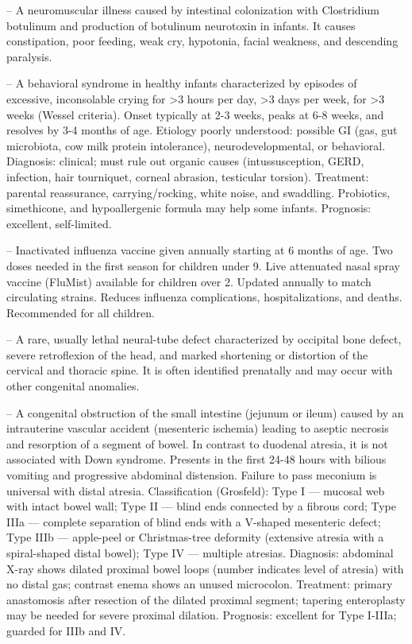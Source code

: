 -- A neuromuscular illness caused by intestinal colonization with Clostridium botulinum and production of botulinum neurotoxin in infants. It causes constipation, poor feeding, weak cry, hypotonia, facial weakness, and descending paralysis.

-- A behavioral syndrome in healthy infants characterized by episodes of excessive, inconsolable crying for >3 hours per day, >3 days per week, for >3 weeks (Wessel criteria). Onset typically at 2-3 weeks, peaks at 6-8 weeks, and resolves by 3-4 months of age. Etiology poorly understood: possible GI (gas, gut microbiota, cow milk protein intolerance), neurodevelopmental, or behavioral. Diagnosis: clinical; must rule out organic causes (intussusception, GERD, infection, hair tourniquet, corneal abrasion, testicular torsion). Treatment: parental reassurance, carrying/rocking, white noise, and swaddling. Probiotics, simethicone, and hypoallergenic formula may help some infants. Prognosis: excellent, self-limited.

-- Inactivated influenza vaccine given annually starting at 6 months of age. Two doses needed in the first season for children under 9. Live attenuated nasal spray vaccine (FluMist) available for children over 2. Updated annually to match circulating strains. Reduces influenza complications, hospitalizations, and deaths. Recommended for all children.

-- A rare, usually lethal neural-tube defect characterized by occipital bone defect, severe retroflexion of the head, and marked shortening or distortion of the cervical and thoracic spine. It is often identified prenatally and may occur with other congenital anomalies.

-- A congenital obstruction of the small intestine (jejunum or ileum) caused by an intrauterine vascular accident (mesenteric ischemia) leading to aseptic necrosis and resorption of a segment of bowel. In contrast to duodenal atresia, it is not associated with Down syndrome. Presents in the first 24-48 hours with bilious vomiting and progressive abdominal distension. Failure to pass meconium is universal with distal atresia. Classification (Grosfeld): Type I — mucosal web with intact bowel wall; Type II — blind ends connected by a fibrous cord; Type IIIa — complete separation of blind ends with a V-shaped mesenteric defect; Type IIIb — apple-peel or Christmas-tree deformity (extensive atresia with a spiral-shaped distal bowel); Type IV — multiple atresias. Diagnosis: abdominal X-ray shows dilated proximal bowel loops (number indicates level of atresia) with no distal gas; contrast enema shows an unused microcolon. Treatment: primary anastomosis after resection of the dilated proximal segment; tapering enteroplasty may be needed for severe proximal dilation. Prognosis: excellent for Type I-IIIa; guarded for IIIb and IV.

